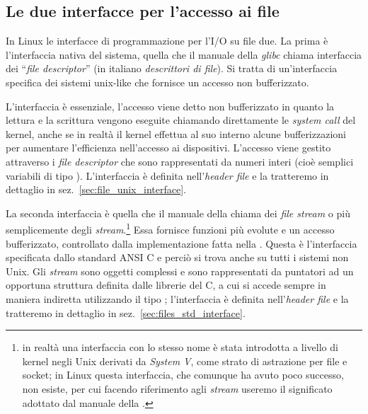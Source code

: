 

\subsection{Le due interfacce per l'accesso ai file}
\label{sec:file_io_api}



In Linux le interfacce di programmazione per l'I/O su file due.  La prima è
l'interfaccia nativa del sistema, quella che il manuale della \textsl{glibc}
chiama interfaccia dei ``\textit{file descriptor}'' (in italiano
\textsl{descrittori di file}). Si tratta di un'interfaccia specifica dei
sistemi unix-like che fornisce un accesso non bufferizzato.

L'interfaccia è essenziale, l'accesso viene detto non bufferizzato in quanto
la lettura e la scrittura vengono eseguite chiamando direttamente le
\textit{system call} del kernel, anche se in realtà il kernel effettua al suo
interno alcune bufferizzazioni per aumentare l'efficienza nell'accesso ai
dispositivi. L'accesso viene gestito attraverso i \textit{file descriptor} che
sono rappresentati da numeri interi (cioè semplici variabili di tipo
).  L'interfaccia è definita nell'\textit{header file}
 e la tratteremo in dettaglio in
sez.~\ref{sec:file_unix_interface}.


La seconda interfaccia è quella che il manuale della  chiama dei
\textit{file stream} o più semplicemente degli \textit{stream}.\footnote{in
  realtà una interfaccia con lo stesso nome è stata introdotta a livello di
  kernel negli Unix derivati da \textit{System V}, come strato di astrazione
  per file e socket; in Linux questa interfaccia, che comunque ha avuto poco
  successo, non esiste, per cui facendo riferimento agli \textit{stream}
  useremo il significato adottato dal manuale della .} Essa
fornisce funzioni più evolute e un accesso bufferizzato, controllato dalla
implementazione fatta nella .  Questa è l'interfaccia specificata
dallo standard ANSI C e perciò si trova anche su tutti i sistemi non Unix. Gli
\textit{stream} sono oggetti complessi e sono rappresentati da puntatori ad un
opportuna struttura definita dalle librerie del C, a cui si accede sempre in
maniera indiretta utilizzando il tipo ; l'interfaccia è definita
nell'\textit{header file}  e la tratteremo in dettaglio in
sez.~\ref{sec:files_std_interface}.

